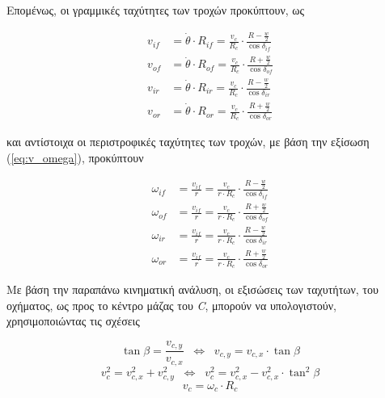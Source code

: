 \bigskip
Επομένως, οι γραμμικές ταχύτητες των τροχών προκύπτουν, ως

\begin{align}
	\label{eq:neg_4ws_vif}	
	v_{if} &= \dot\theta \cdot R_{if} = \frac{v_c}{R_c} \cdot \frac{R - \frac{w}{2}}{\cos{\delta_{if}}}\\
	\label{eq:neg_4ws_vof}	
	v_{of} &= \dot\theta \cdot R_{of} = \frac{v_c}{R_c} \cdot \frac{R + \frac{w}{2}}{\cos{\delta_{of}}}\\
	\label{eq:neg_4ws_vir}	
	v_{ir} &= \dot\theta \cdot R_{ir} = \frac{v_c}{R_c} \cdot \frac{R - \frac{w}{2}}{\cos{\delta_{ir}}} \\
	\label{eq:neg_4ws_vor}
	v_{or} &= \dot\theta \cdot R_{or} = \frac{v_c}{R_c} \cdot \frac{R + \frac{w}{2}}{\cos{\delta_{or}}}
\end{align}

\bigskip
\noindent
και αντίστοιχα οι περιστροφικές ταχύτητες των τροχών, με βάση την εξίσωση (\ref{eq:v_omega}), προκύπτουν

\begin{align}
	\label{eq:neg_4ws_wif}	
	\omega_{if} &= \frac{v_{if}}{r} = \frac{v_c}{r \cdot R_c} \cdot \frac{R - \frac{w}{2}}{\cos{\delta_{if}}}\\
	\label{eq:neg_4ws_wof}	
	\omega_{of} &= \frac{v_{if}}{r} = \frac{v_c}{r \cdot R_c} \cdot \frac{R + \frac{w}{2}}{\cos{\delta_{of}}}\\
	\label{eq:neg_4ws_wir}	
	\omega_{ir} &= \frac{v_{if}}{r} = \frac{v_c}{r \cdot R_c} \cdot \frac{R - \frac{w}{2}}{\cos{\delta_{ir}}} \\
	\label{eq:neg_4ws_wor}
	\omega_{or} &= \frac{v_{if}}{r} = \frac{v_c}{r \cdot R_c} \cdot \frac{R + \frac{w}{2}}{\cos{\delta_{or}}}
\end{align} 

\bigskip
Με βάση την παραπάνω κινηματική ανάλυση, οι εξισώσεις των ταχυτήτων, του οχήματος, ως προς το κέντρο μάζας του \textit{C}, μπορούν να υπολογιστούν, χρησιμοποιώντας τις σχέσεις

\begin{equation}
	\tan{\beta} = \frac{v_{c,y}}{v_{c,x}} \;\;\Leftrightarrow\;\; v_{c,y} = v_{c,x} \cdot \tan{\beta}
	\label{eq:vel_beta}
\end{equation}
\begin{equation}
	v_c^2 = v_{c,x}^2 + v_{c,y}^2 \;\;\Leftrightarrow\;\; v_{c}^2 = v_{c,x}^2 - v_{c,x}^2  \cdot \tan^2{\beta}
	\label{eq:v_squared}
\end{equation}
\begin{equation}
	v_c = \omega_c \cdot R_c
	\label{eq:lin_ang_relationship}
\end{equation}

